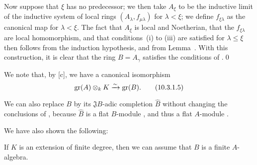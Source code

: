 \begin{env}[10.3.1.4]
Now suppose that $\xi$ has no predecessor;
we then take $A_\xi$ to be the inductive limit of the inductive system of local rings $(A_\lambda,f_{\mu\lambda})$ for $\lambda<\xi$;
we define $f_{\xi\lambda}$ as the canonical map for $\lambda<\xi$.
The fact that $A_\xi$ is local and Noetherian, that the $f_{\xi\lambda}$ are local homomorphism, and that conditions~(i) to (iii) are satisfied for $\lambda\leq\xi$
then follows from the induction hypothesis, and from Lemma~.
With this construction, it is clear that the ring $B=A_\gamma$ satisfies the conditions of .\qed
\end{env}

We note that, by [c], we have a canonical isomorphism
\[
\label{0.10.3.1.5}
  \operatorname{gr}(A)\otimes_k K\xrightarrow{\sim}\operatorname{gr}(B).
  \tag{10.3.1.5}
\]

We can also replace $B$ by its $\mathfrak{J}B$-adic completion $\widehat{B}$ without changing the conclusions of , because $\widehat{B}$ is a flat $B$-module , and thus a flat $A$-module .

We have also shown the following:
\begin{corollary}[10.3.2]
\label{0.10.3.2}
If $K$ is an extension of finite degree, then we can assume that $B$ is a finite $A$-algebra.
\end{corollary}

